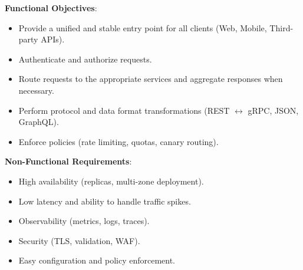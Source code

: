 \documentclass[a4paper,11pt]{article}
\begin{document}
\textbf{Functional Objectives}:
\begin{itemize}
  \item Provide a unified and stable entry point for all clients (Web, Mobile, Third-party APIs).
  \item Authenticate and authorize requests.
  \item Route requests to the appropriate services and aggregate responses when necessary.
  \item Perform protocol and data format transformations (REST $\leftrightarrow$ gRPC, JSON, GraphQL).
  \item Enforce policies (rate limiting, quotas, canary routing).
\end{itemize}

\textbf{Non-Functional Requirements}:
\begin{itemize}
  \item High availability (replicas, multi-zone deployment).
  \item Low latency and ability to handle traffic spikes.
  \item Observability (metrics, logs, traces).
  \item Security (TLS, validation, WAF).
  \item Easy configuration and policy enforcement.
\end{itemize}
\end{document}
